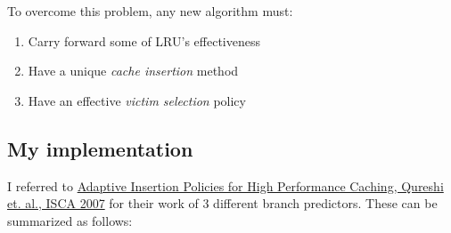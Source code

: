 \documentclass[a4paper]{article}
\begin{document}
        To overcome this problem, any new algorithm must:
        \begin{enumerate}
            \item Carry forward some of LRU's effectiveness
            \item Have a unique \textit{cache insertion} method
            \item Have an effective \textit{victim selection} policy
        \end{enumerate}
        
    \subsection{My implementation}
        I referred to \href{https://people.csail.mit.edu/emer/papers/2007.06.isca.dip.pdf}{Adaptive Insertion Policies for High Performance Caching, Qureshi et. al., ISCA 2007} for their work of 3 different branch predictors. These can be summarized as follows:
\end{document}
